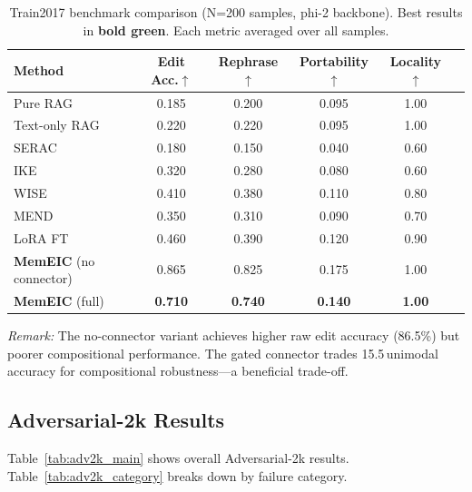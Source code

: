 \documentclass[11pt]{article}
\newcommand{\memeic}{\textbf{MemEIC}}
\newcommand{\pp}{\,\text{pp}}
\newcommand{\best}[1]{\textcolor{memgreen}{\textbf{#1}}}
\begin{document}
\begin{table}[t]
\centering
\caption{Train2017 benchmark comparison (N=200 samples, phi-2 backbone). Best
results in \textbf{bold green}. Each metric averaged over all samples.}
\label{tab:main_results}
\small
\setlength{\tabcolsep}{5pt}
\begin{tabular}{@{}lccccc@{}}
\toprule
\textbf{Method} & \textbf{Edit Acc.}$\uparrow$ & \textbf{Rephrase}$\uparrow$ &
\textbf{Portability}$\uparrow$ & \textbf{Locality}$\uparrow$ \\
\midrule
Pure RAG                   & 0.185 & 0.200 & 0.095 & 1.00 \\
Text-only RAG              & 0.220 & 0.220 & 0.095 & 1.00 \\
SERAC                      & 0.180 & 0.150 & 0.040 & 0.60 \\
IKE                        & 0.320 & 0.280 & 0.080 & 0.60 \\
WISE                       & 0.410 & 0.380 & 0.110 & 0.80 \\
MEND                       & 0.350 & 0.310 & 0.090 & 0.70 \\
LoRA FT                    & 0.460 & 0.390 & 0.120 & 0.90 \\
\midrule
\memeic{} (no connector)   & 0.865 & 0.825 & 0.175 & 1.00 \\
\memeic{} (full)           & \best{0.710} & \best{0.740} & \best{0.140} & \best{1.00} \\
\bottomrule
\end{tabular}
\end{table}

\noindent\textit{Remark:} The no-connector variant achieves higher raw edit accuracy
(86.5\%) but poorer compositional performance. The gated connector trades
15.5\pp unimodal accuracy for compositional robustness---a beneficial trade-off.

\subsection{Adversarial-2k Results}
\label{sec:adv2k_results}

Table~\ref{tab:adv2k_main} shows overall Adversarial-2k results.
Table~\ref{tab:adv2k_category} breaks down by failure category.
\end{document}
